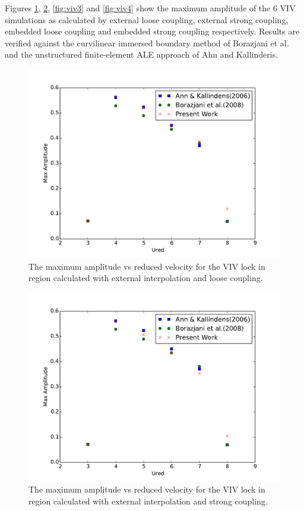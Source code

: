 Figures \ref{fig:viv1}, \ref{fig:viv2}, \ref{fig:viv3} and \ref{fig:viv4} show the maximum amplitude of the 6 VIV simulations as calculated by external loose coupling, external strong coupling, embedded loose coupling and embedded strong coupling respectively.
Results are verified against the curvilinear immersed boundary method of Borazjani et al.\cite{borazjani2008curvilinear} and the unstructured finite-element ALE approach of Ahn and Kallinderis\cite{ahn2006strongly}.
\begin{figure}
	\centering
	\includegraphics[width=\textwidth]{vivexlc}
	\caption{The maximum amplitude vs reduced velocity for the VIV lock in region calculated with external interpolation and loose coupling.}
	\label{fig:viv1}
\end{figure}
\begin{figure}
	\centering
	\includegraphics[width=\textwidth]{vivexsc}
	\caption{The maximum amplitude vs reduced velocity for the VIV lock in region calculated with external interpolation and strong coupling.}
	\label{fig:viv2}
\end{figure}
